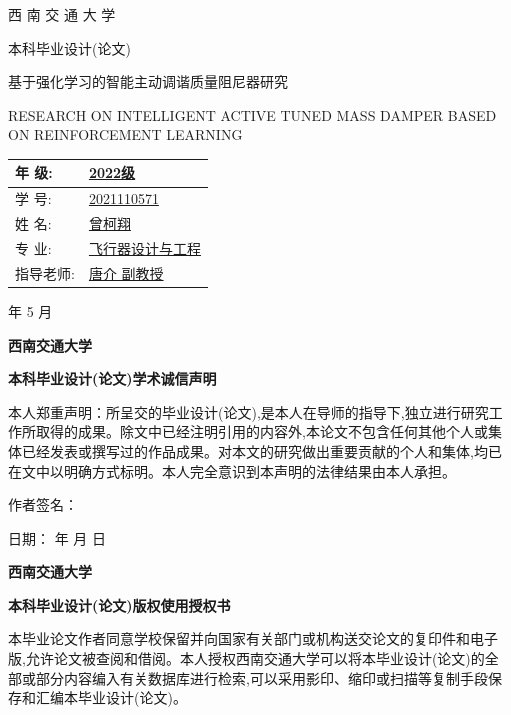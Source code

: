 \documentclass{scrbook}
\begin{document}
{\centering 西 南 交 通 大 学

\par}{\centering 本科毕业设计(论文)

\par}{\centering 基于强化学习的智能主动调谐质量阻尼器研究

\par}{\centering RESEARCH ON INTELLIGENT ACTIVE TUNED MASS DAMPER BASED ON REINFORCEMENT LEARNING

\par}
\begin{table}
\begin{tabularx}{\textwidth}{|p{}|p{}|} \hline 
\centering\arraybackslash{}年    级: & \uline{                       2022级                      }\\\hline 
\centering\arraybackslash{}学    号: & \uline{                   2021110571                   }\\\hline 
\centering\arraybackslash{}姓    名: & \uline{                      曾柯翔                        }\\\hline 
\centering\arraybackslash{}专    业: & \uline{           飞行器设计与工程               }\\\hline 
\centering\arraybackslash{}指导老师: & \uline{         唐介 副教授                  }\\\hline 
\end{tabularx}
\end{table}
{ 年  5 月 

\par}{\centering \textbf{西南交通大学}

\par}{\centering \textbf{本科毕业设计(论文)学术诚信声明}

\par}本人郑重声明：所呈交的毕业设计(论文),是本人在导师的指导下,独立进行研究工作所取得的成果。除文中已经注明引用的内容外,本论文不包含任何其他个人或集体已经发表或撰写过的作品成果。对本文的研究做出重要贡献的个人和集体,均已在文中以明确方式标明。本人完全意识到本声明的法律结果由本人承担。

作者签名：

日期：        年        月         日

{\centering \textbf{西南交通大学}

\par}{\centering \textbf{本科毕业设计(论文)版权使用授权书}

\par}本毕业论文作者同意学校保留并向国家有关部门或机构送交论文的复印件和电子版,允许论文被查阅和借阅。本人授权西南交通大学可以将本毕业设计(论文)的全部或部分内容编入有关数据库进行检索,可以采用影印、缩印或扫描等复制手段保存和汇编本毕业设计(论文)。
\end{document}
